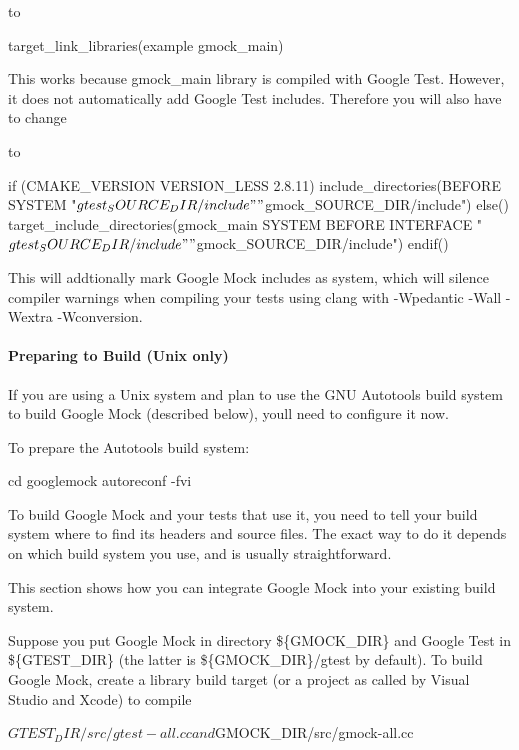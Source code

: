 to \begin{DoxyVerb}target_link_libraries(example gmock_main)
\end{DoxyVerb}


This works because {\ttfamily gmock\+\_\+main} library is compiled with Google Test. However, it does not automatically add Google Test includes. Therefore you will also have to change 


to \begin{DoxyVerb}if (CMAKE_VERSION VERSION_LESS 2.8.11)
  include_directories(BEFORE SYSTEM
    "${gtest_SOURCE_DIR}/include" "${gmock_SOURCE_DIR}/include")
else()
  target_include_directories(gmock_main SYSTEM BEFORE INTERFACE
    "${gtest_SOURCE_DIR}/include" "${gmock_SOURCE_DIR}/include")
endif()
\end{DoxyVerb}


This will addtionally mark Google Mock includes as system, which will silence compiler warnings when compiling your tests using clang with {\ttfamily -\/Wpedantic -\/Wall -\/Wextra -\/Wconversion}.

\paragraph*{Preparing to Build (Unix only)}

If you are using a Unix system and plan to use the G\+NU Autotools build system to build Google Mock (described below), you\textquotesingle{}ll need to configure it now.

To prepare the Autotools build system\+: \begin{DoxyVerb}cd googlemock
autoreconf -fvi
\end{DoxyVerb}


To build Google Mock and your tests that use it, you need to tell your build system where to find its headers and source files. The exact way to do it depends on which build system you use, and is usually straightforward.

This section shows how you can integrate Google Mock into your existing build system.

Suppose you put Google Mock in directory {\ttfamily \$\{G\+M\+O\+C\+K\+\_\+\+D\+IR\}} and Google Test in {\ttfamily \$\{G\+T\+E\+S\+T\+\_\+\+D\+IR\}} (the latter is {\ttfamily \$\{G\+M\+O\+C\+K\+\_\+\+D\+IR\}/gtest} by default). To build Google Mock, create a library build target (or a project as called by Visual Studio and Xcode) to compile \begin{DoxyVerb}${GTEST_DIR}/src/gtest-all.cc and ${GMOCK_DIR}/src/gmock-all.cc
\end{DoxyVerb}


